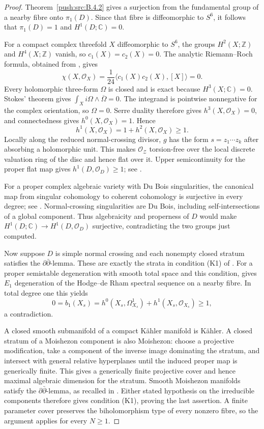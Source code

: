 \begin{proof}
Theorem~\ref{push:src:B.4.2} gives a surjection from the fundamental group of a nearby fibre onto $\pi_1(D)$. Since that fibre is diffeomorphic to $S^6$, it follows that $\pi_1(D)=1$ and $H^1(D;\mathbb C)=0$.

For a compact complex threefold $X$ diffeomorphic to $S^6$, the groups $H^2(X;\mathbb Z)$ and $H^4(X;\mathbb Z)$ vanish, so $c_1(X)=c_2(X)=0$. The analytic Riemann--Roch formula, obtained from \citet[Theorem~4.3, pp.~564--565]{AtiyahSinger1968IIIE}, gives
\[
 \chi(X,\mathcal O_X)=\frac1{24}\langle c_1(X)c_2(X),[X]\rangle=0.
\]
Every holomorphic three-form $\Omega$ is closed and is exact because $H^3(X;\mathbb C)=0$. Stokes' theorem gives $\int_X i\Omega\wedge\overline\Omega=0$. The integrand is pointwise nonnegative for the complex orientation, so $\Omega=0$. Serre duality therefore gives $h^3(X,\mathcal O_X)=0$, and connectedness gives $h^0(X,\mathcal O_X)=1$. Hence
\[
 h^1(X,\mathcal O_X)=1+h^2(X,\mathcal O_X)\geq1.
\]
Locally along the reduced normal-crossing divisor, $g$ has the form $s=z_1\cdots z_k$ after absorbing a holomorphic unit. This makes $\mathcal O_{\mathcal Z}$ torsion-free over the local discrete valuation ring of the disc and hence flat over it. Upper semicontinuity for the proper flat map gives $h^1(D,\mathcal O_D)\geq1$; see \citet[\S7, Satz~5, pp.~63--64]{Grauert60}.

For a proper complex algebraic variety with Du Bois singularities, the canonical map from singular cohomology to coherent cohomology is surjective in every degree; see \citet[\S1.D, p.~120]{GrafKovacs2014Root}. Normal-crossing singularities are Du Bois, including self-intersections of a global component. Thus algebraicity and properness of $D$ would make $H^1(D;\mathbb C)\to H^1(D,\mathcal O_D)$ surjective, contradicting the two groups just computed.

Now suppose $D$ is simple normal crossing and each nonempty closed stratum satisfies the $\partial\bar\partial$-lemma. These are exactly the strata in condition (K1) of \citet[Definition~2.3, p.~9]{Chen2026HodgeRoot}. For a proper semistable degeneration with smooth total space and this condition, \citet[Theorem~2.4(4), p.~10]{Chen2026HodgeRoot} gives $E_1$ degeneration of the Hodge--de Rham spectral sequence on a nearby fibre. In total degree one this yields
\[
 0=b_1(X_s)=h^0(X_s,\Omega^1_{X_s})+h^1(X_s,\mathcal O_{X_s})\geq1,
\]
a contradiction.

A closed smooth submanifold of a compact K\"ahler manifold is K\"ahler. A closed stratum of a Moishezon component is also Moishezon: choose a projective modification, take a component of the inverse image dominating the stratum, and intersect with general relative hyperplanes until the induced proper map is generically finite. This gives a generically finite projective cover and hence maximal algebraic dimension for the stratum. Smooth Moishezon manifolds satisfy the $\partial\bar\partial$-lemma, as recalled in \citet[\S2.1, p.~8]{Chen2026HodgeRoot}. Either stated hypothesis on the irreducible components therefore gives condition (K1), proving the last assertion. A finite parameter cover preserves the biholomorphism type of every nonzero fibre, so the argument applies for every $N\geq1$.
\end{proof}
